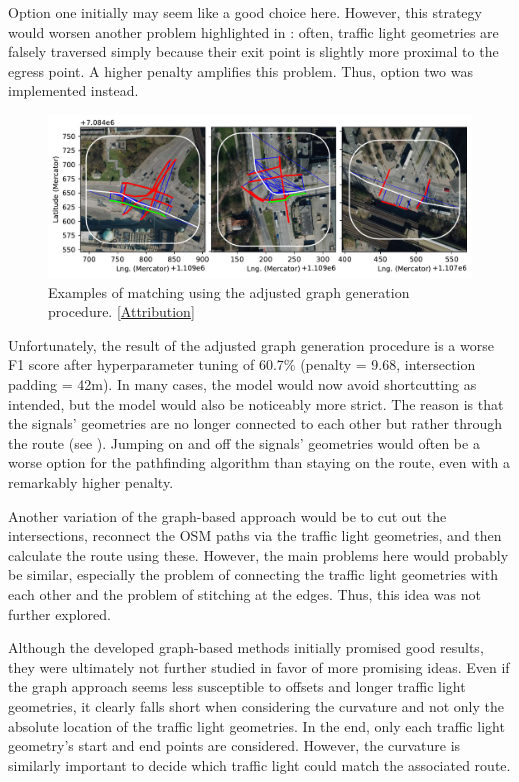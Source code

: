 Option one initially may seem like a good choice here. However, this strategy would worsen another problem highlighted in : often, traffic light geometries are falsely traversed simply because their exit point is slightly more proximal to the egress point. A higher penalty amplifies this problem. Thus, option two was implemented instead. 

\begin{figure}[htbp]
\centering
\includegraphics[width=\linewidth]{images/matching-dijkstra-strict.pdf}
\caption{Examples of matching using the adjusted graph generation procedure. [\hyperref[attribution]{Attribution}]}
\label{fig:sg-selection-graph-strict}
\end{figure}

Unfortunately, the result of the adjusted graph generation procedure is a worse F1 score after hyperparameter tuning of 60.7\% (penalty = 9.68, intersection padding = 42m). In many cases, the model would now avoid shortcutting as intended, but the model would also be noticeably more strict. The reason is that the signals' geometries are no longer connected to each other but rather through the route (see ). Jumping on and off the signals' geometries would often be a worse option for the pathfinding algorithm than staying on the route, even with a remarkably higher penalty. 

Another variation of the graph-based approach would be to cut out the intersections, reconnect the OSM paths via the traffic light geometries, and then calculate the route using these. However, the main problems here would probably be similar, especially the problem of connecting the traffic light geometries with each other and the problem of stitching at the edges. Thus, this idea was not further explored.

Although the developed graph-based methods initially promised good results, they were ultimately not further studied in favor of more promising ideas. Even if the graph approach seems less susceptible to offsets and longer traffic light geometries, it clearly falls short when considering the curvature and not only the absolute location of the traffic light geometries. In the end, only each traffic light geometry's start and end points are considered. However, the curvature is similarly important to decide which traffic light could match the associated route.

